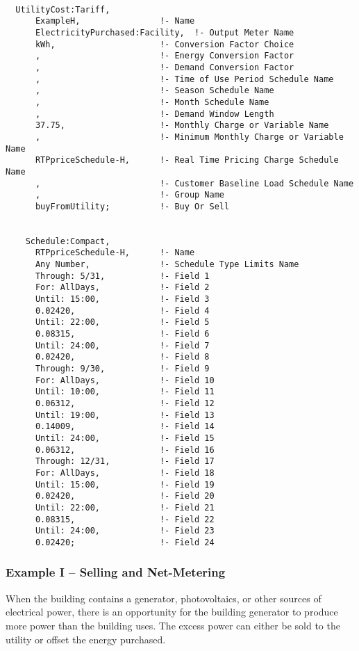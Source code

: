 \begin{lstlisting}

  UtilityCost:Tariff,
      ExampleH,                !- Name
      ElectricityPurchased:Facility,  !- Output Meter Name
      kWh,                     !- Conversion Factor Choice
      ,                        !- Energy Conversion Factor
      ,                        !- Demand Conversion Factor
      ,                        !- Time of Use Period Schedule Name
      ,                        !- Season Schedule Name
      ,                        !- Month Schedule Name
      ,                        !- Demand Window Length
      37.75,                   !- Monthly Charge or Variable Name
      ,                        !- Minimum Monthly Charge or Variable Name
      RTPpriceSchedule-H,      !- Real Time Pricing Charge Schedule Name
      ,                        !- Customer Baseline Load Schedule Name
      ,                        !- Group Name
      buyFromUtility;          !- Buy Or Sell


    Schedule:Compact,
      RTPpriceSchedule-H,      !- Name
      Any Number,              !- Schedule Type Limits Name
      Through: 5/31,           !- Field 1
      For: AllDays,            !- Field 2
      Until: 15:00,            !- Field 3
      0.02420,                 !- Field 4
      Until: 22:00,            !- Field 5
      0.08315,                 !- Field 6
      Until: 24:00,            !- Field 7
      0.02420,                 !- Field 8
      Through: 9/30,           !- Field 9
      For: AllDays,            !- Field 10
      Until: 10:00,            !- Field 11
      0.06312,                 !- Field 12
      Until: 19:00,            !- Field 13
      0.14009,                 !- Field 14
      Until: 24:00,            !- Field 15
      0.06312,                 !- Field 16
      Through: 12/31,          !- Field 17
      For: AllDays,            !- Field 18
      Until: 15:00,            !- Field 19
      0.02420,                 !- Field 20
      Until: 22:00,            !- Field 21
      0.08315,                 !- Field 22
      Until: 24:00,            !- Field 23
      0.02420;                 !- Field 24
\end{lstlisting}

\subsubsection{Example I -- Selling and Net-Metering}\label{example-i-selling-and-net-metering}

When the building contains a generator, photovoltaics, or other sources of electrical power, there is an opportunity for the building generator to produce more power than the building uses. The excess power can either be sold to the utility or offset the energy purchased.

